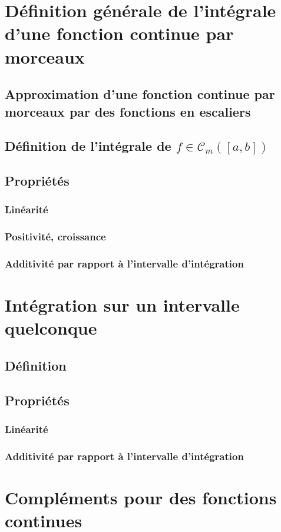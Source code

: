 \documentclass[12pt,a4paper,french]{book}
\begin{document}
	\section{Définition générale de l'intégrale d'une fonction continue par morceaux}
		\subsection{Approximation d'une fonction continue par morceaux par des fonctions en escaliers}
		\subsection{Définition de l'intégrale de $f \in \mathcal{C}_m([a,b])$}
		\subsection{Propriétés}
			\subsubsection{Linéarité}
			\subsubsection{Positivité, croissance}
			\subsubsection{Additivité par rapport à l'intervalle d'intégration}
	\section{Intégration sur un intervalle quelconque}
		\subsection{Définition}
		\subsection{Propriétés}
			\subsubsection{Linéarité}
			\subsubsection{Additivité par rapport à l'intervalle d'intégration}
	\section{Compléments pour des fonctions continues}
\end{document}
